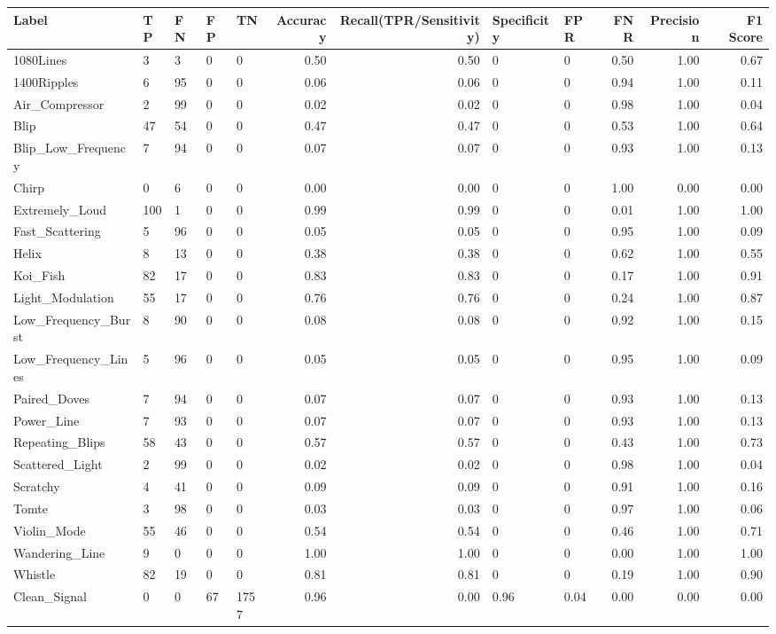 \begin{tabular}{lllllrrllrrr}
\toprule
Label & TP & FN & FP & TN & Accuracy & Recall(TPR/Sensitivity) & Specificity & FPR & FNR & Precision & F1 Score \\
\midrule
1080Lines & 3 & 3 & 0 & 0 & 0.50 & 0.50 & 0 & 0 & 0.50 & 1.00 & 0.67 \\
1400Ripples & 6 & 95 & 0 & 0 & 0.06 & 0.06 & 0 & 0 & 0.94 & 1.00 & 0.11 \\
Air\_Compressor & 2 & 99 & 0 & 0 & 0.02 & 0.02 & 0 & 0 & 0.98 & 1.00 & 0.04 \\
Blip & 47 & 54 & 0 & 0 & 0.47 & 0.47 & 0 & 0 & 0.53 & 1.00 & 0.64 \\
Blip\_Low\_Frequency & 7 & 94 & 0 & 0 & 0.07 & 0.07 & 0 & 0 & 0.93 & 1.00 & 0.13 \\
Chirp & 0 & 6 & 0 & 0 & 0.00 & 0.00 & 0 & 0 & 1.00 & 0.00 & 0.00 \\
Extremely\_Loud & 100 & 1 & 0 & 0 & 0.99 & 0.99 & 0 & 0 & 0.01 & 1.00 & 1.00 \\
Fast\_Scattering & 5 & 96 & 0 & 0 & 0.05 & 0.05 & 0 & 0 & 0.95 & 1.00 & 0.09 \\
Helix & 8 & 13 & 0 & 0 & 0.38 & 0.38 & 0 & 0 & 0.62 & 1.00 & 0.55 \\
Koi\_Fish & 82 & 17 & 0 & 0 & 0.83 & 0.83 & 0 & 0 & 0.17 & 1.00 & 0.91 \\
Light\_Modulation & 55 & 17 & 0 & 0 & 0.76 & 0.76 & 0 & 0 & 0.24 & 1.00 & 0.87 \\
Low\_Frequency\_Burst & 8 & 90 & 0 & 0 & 0.08 & 0.08 & 0 & 0 & 0.92 & 1.00 & 0.15 \\
Low\_Frequency\_Lines & 5 & 96 & 0 & 0 & 0.05 & 0.05 & 0 & 0 & 0.95 & 1.00 & 0.09 \\
Paired\_Doves & 7 & 94 & 0 & 0 & 0.07 & 0.07 & 0 & 0 & 0.93 & 1.00 & 0.13 \\
Power\_Line & 7 & 93 & 0 & 0 & 0.07 & 0.07 & 0 & 0 & 0.93 & 1.00 & 0.13 \\
Repeating\_Blips & 58 & 43 & 0 & 0 & 0.57 & 0.57 & 0 & 0 & 0.43 & 1.00 & 0.73 \\
Scattered\_Light & 2 & 99 & 0 & 0 & 0.02 & 0.02 & 0 & 0 & 0.98 & 1.00 & 0.04 \\
Scratchy & 4 & 41 & 0 & 0 & 0.09 & 0.09 & 0 & 0 & 0.91 & 1.00 & 0.16 \\
Tomte & 3 & 98 & 0 & 0 & 0.03 & 0.03 & 0 & 0 & 0.97 & 1.00 & 0.06 \\
Violin\_Mode & 55 & 46 & 0 & 0 & 0.54 & 0.54 & 0 & 0 & 0.46 & 1.00 & 0.71 \\
Wandering\_Line & 9 & 0 & 0 & 0 & 1.00 & 1.00 & 0 & 0 & 0.00 & 1.00 & 1.00 \\
Whistle & 82 & 19 & 0 & 0 & 0.81 & 0.81 & 0 & 0 & 0.19 & 1.00 & 0.90 \\
Clean\_Signal & 0 & 0 & 67 & 1757 & 0.96 & 0.00 & 0.96 & 0.04 & 0.00 & 0.00 & 0.00 \\
\bottomrule
\end{tabular}
